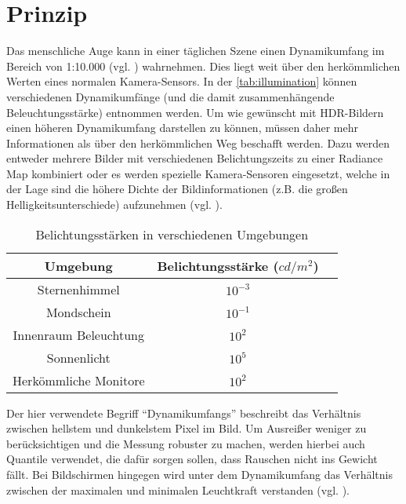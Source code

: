 \section{Prinzip}

Das menschliche Auge kann in einer täglichen Szene einen \gls{Dynamikumfang} im Bereich von 1:10.000 (vgl. \cite{Fairchild04theicam}) wahrnehmen. Dies liegt weit über den herkömmlichen Werten eines normalen Kamera-Sensors. In der \autoref{tab:illumination} können verschiedenen Dynamikumfänge (und die damit zusammenhängende Beleuchtungsstärke) entnommen werden. 
Um wie gewünscht mit \gls{HDR}-Bildern einen höheren \gls{Dynamikumfang} darstellen zu können, müssen daher mehr Informationen als über den herkömmlichen Weg beschafft werden. Dazu werden entweder mehrere Bilder mit verschiedenen \glspl{Belichtungszeit} zu einer \gls{Radiance Map} kombiniert oder es werden spezielle Kamera-Sensoren eingesetzt, welche in der Lage sind die höhere Dichte der Bildinformationen (z.B. die großen Helligkeitsunterschiede) aufzunehmen (vgl. \cite{Yang99a640}). 


\begin{table}
  \begin{center}
    \begin{tabular}{ccc}
	\toprule
	Umgebung & Belichtungsstärke ($cd/m^2$)\\ \midrule
	Sternenhimmel & $10^{-3} $\\	
	Mondschein & $10^{-1} $\\	
	Innenraum Beleuchtung & $10^{2} $\\	
	Sonnenlicht & $10^{5} $\\	
	\midrule
	Herkömmliche Monitore & $10^{2} $\\	
	\bottomrule
    \end{tabular}
    \caption{Belichtungsstärken in verschiedenen Umgebungen \cite[S.~6]{Reinhard}}
    \label{tab:illumination}
  \end{center}
\end{table}



Der hier verwendete Begriff \enquote{\glspl{Dynamikumfang}} beschreibt das Verhältnis zwischen hellstem und dunkelstem Pixel im Bild. Um Ausreißer weniger zu berücksichtigen und die Messung robuster zu machen, werden hierbei auch Quantile verwendet, die dafür sorgen sollen, dass Rauschen nicht ins Gewicht fällt. Bei Bildschirmen hingegen wird unter dem \gls{Dynamikumfang} das Verhältnis zwischen der maximalen und minimalen Leuchtkraft verstanden (vgl. \cite[S.~4]{Reinhard}).

